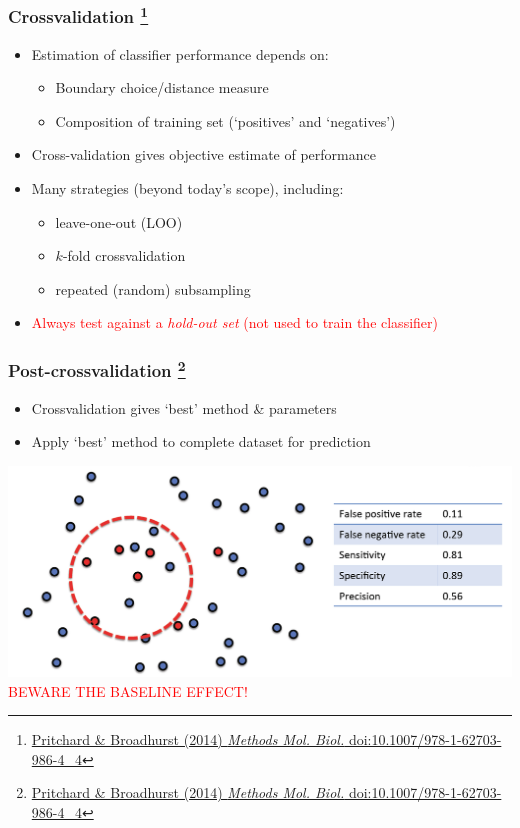 \begin{frame}
  \frametitle{Crossvalidation
    \footnote{\tiny{\href{http://dx.doi.org/10.1007/978-1-62703-986-4_4}{Pritchard \& Broadhurst (2014) \textit{Methods Mol. Biol.} doi:10.1007/978-1-62703-986-4\_4}}}
}
      \begin{itemize}  
        \item \textcolor{hutton_green}{Estimation of classifier performance depends on:}
          \begin{itemize}
            \item Boundary choice/distance measure
            \item Composition of training set (`positives' and `negatives')
          \end{itemize}
        \item \textcolor{hutton_blue}{Cross-validation gives objective estimate of performance}
        \item \textcolor{hutton_purple}{Many strategies (beyond today's scope), including:}
          \begin{itemize}
            \item leave-one-out (LOO)
            \item $k$-fold crossvalidation
            \item repeated (random) subsampling
          \end{itemize}
        \item \textcolor{red}{Always test against a \textit{hold-out set} (not used to train the classifier)}
        \end{itemize}          
\end{frame}

\begin{frame}
  \frametitle{Post-crossvalidation
  \footnote{\tiny{\href{http://dx.doi.org/10.1007/978-1-62703-986-4_4}{Pritchard \& Broadhurst (2014) \textit{Methods Mol. Biol.} doi:10.1007/978-1-62703-986-4\_4}}}
}
  \begin{itemize}
    \item \textcolor{hutton_green}{Crossvalidation gives `best' method \& parameters}
    \item \textcolor{hutton_purple}{Apply `best' method to complete dataset for prediction}
  \end{itemize}
  \includegraphics[width=1\textwidth]{images/finding_effectors12}    \\
  \textcolor{red}{BEWARE THE BASELINE EFFECT!}
\end{frame}

